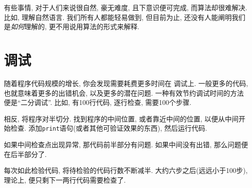 \documentclass[10pt]{book}
\begin{document}
有些事情, 对于人们来说很自然, 豪无难度, 且下意识便可完成, 
而算法却很难解决. 
比如, 理解自然语言. 我们所有人都能轻易做到, 
但目前为止, 还没有人能阐明我们是{\em 如何}理解的, 
更不用说用算法的形式来解释. 

\section{调试}
\label{bisectbug}

随着程序代码规模的增长, 你会发现需要耗费更多时间在
调试上. 一般更多的代码, 也就意味着更多的出错机会, 
以及更多的潜在问题. 
一种有效节约调试时间的方法便是``二分调试''.
比如, 有100行代码, 逐行检查, 需要100个步骤. 

相反, 将程序对半切分. 找到程序的中间位置, 或者靠近中间的位置, 
以便从中间开始检查. 添加{\tt print}语句(或者其他可验证效果的东西), 
然后运行代码. 

如果中间检查点出现异常, 那代码前半部分有问题. 
如果中间没有出错, 那么问题便在后半部分了. 

每次如此检验代码, 将待检验的代码行数不断减半. 大约六步之后(远远小于100步), 
理论上, 便只剩下一两行代码需要检查了. 
\end{document}
